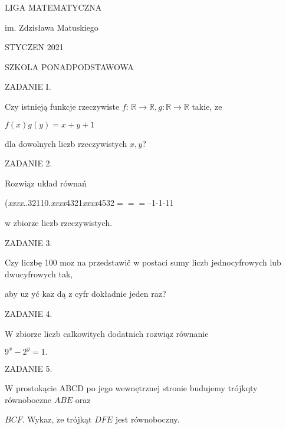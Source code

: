 \documentclass[a4paper,12pt]{article}
\begin{document}
LIGA MATEMATYCZNA

im. Zdzisława Matuskiego

STYCZEN 2021

SZKOLA PONADPODSTAWOWA

ZADANIE I.

Czy istnieją funkcje rzeczywiste $f$: $\mathbb{R}\rightarrow \mathbb{R}, g:\mathbb{R}\rightarrow \mathbb{R}$ takie, $\dot{\mathrm{z}}\mathrm{e}$

$f(x)g(y)=x+y+1$

dla dowolnych liczb rzeczywistych $x, y$?

ZADANIE 2.

Rozwiąz uklad równań

({\it xxxx}..32110.{\it xxxx}4321{\it xxxx}4532$===$--1-1-11

w zbiorze liczb rzeczywistych.

ZADANIE 3.

Czy liczbę 100 $\mathrm{m}\mathrm{o}\dot{\mathrm{z}}$ na przedstawič w postaci sumy liczb jednocyfrowych lub dwucyfrowych tak,

aby $\mathrm{u}\dot{\mathrm{z}}$ yć $\mathrm{k}\mathrm{a}\dot{\mathrm{z}}$ dą z cyfr dokładnie jeden raz?

ZADANIE 4.

$\mathrm{W}$ zbiorze liczb calkowitych dodatnich rozwiąz równanie

$9^{x}-2^{y}=1.$

ZADANIE 5.

$\mathrm{W}$ prostokącie ABCD po jego wewnętrznej stronie budujemy trójkqty równoboczne $ABE$ oraz

$BCF$. Wykaz, $\dot{\mathrm{z}}\mathrm{e}$ trójkąt $DFE$ jest równoboczny.
\end{document}
